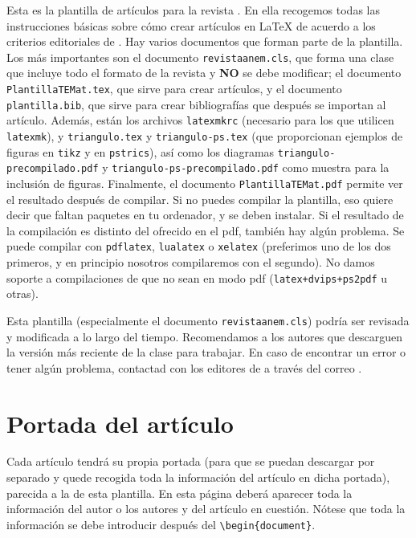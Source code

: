 \documentclass[%
extracommands,%
]{revistaanem}
\begin{document}
Esta es la plantilla de artículos para la revista \nombrerevista{}.
En ella recogemos todas las instrucciones básicas sobre cómo crear artículos en \LaTeX{} de acuerdo a los criterios editoriales de \nombrerevista{}.
Hay varios documentos que forman parte de la plantilla.
Los más importantes son el documento \verb+revistaanem.cls+, que forma una clase que incluye todo el formato de la revista y \textbf{NO} se debe modificar; el documento \verb+PlantillaTEMat.tex+, que sirve para crear artículos, y el documento \verb+plantilla.bib+, que sirve para crear bibliografías que después se importan al artículo.
Además, están los archivos \verb+latexmkrc+ (necesario para los que utilicen \verb+latexmk+), y \verb+triangulo.tex+ y \verb+triangulo-ps.tex+ (que proporcionan ejemplos de figuras en \verb+tikz+ y en \verb+pstrics+), así como los diagramas \verb+triangulo-precompilado.pdf+ y \verb+triangulo-ps-precompilado.pdf+ como muestra para la inclusión de figuras.
Finalmente, el documento \verb+PlantillaTEMat.pdf+ permite ver el resultado después de compilar.
Si no puedes compilar la plantilla, eso quiere decir que faltan paquetes en tu ordenador, y se deben instalar.
Si el resultado de la compilación es distinto del ofrecido en el pdf, también hay algún problema.
Se puede compilar con \verb+pdflatex+, \verb+lualatex+ o \verb+xelatex+ (preferimos uno de los dos primeros, y en principio nosotros compilaremos con el segundo).
No damos soporte a compilaciones de  que no sean en modo pdf (\verb|latex+dvips+ps2pdf| u otras).

Esta plantilla (especialmente el documento \verb+revistaanem.cls+) podría ser revisada y modificada a lo largo del tiempo.
Recomendamos a los autores que descarguen la versión más reciente de la clase para trabajar.
En caso de encontrar un error o tener algún problema, contactad con los editores de \nombrerevista{} a través del correo .

\section{Portada del artículo}

Cada artículo tendrá su propia portada (para que se puedan descargar por separado y quede recogida toda la información del artículo en dicha portada), parecida a la de esta plantilla.
En esta página deberá aparecer toda la información del autor o los autores y del artículo en cuestión.
Nótese que toda la información se debe introducir después del \verb+\begin{document}+.
\end{document}
